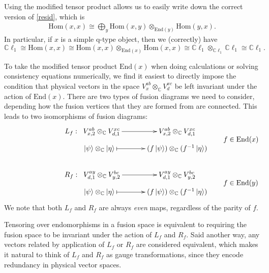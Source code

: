 \documentclass[12pt,a4paper]{article}
\newcommand{\tp}{\otimes}
\newcommand\be            {\begin{equation}}
\newcommand\ee            {\end{equation}}
\newcommand{\Hom}{\text{Hom}}
\newcommand{\End}{\text{End}}
\newcommand{\cl}{\mathbb{C}\ell}
\newcommand{\ket}[1]{\ensuremath{\left|#1\right\rangle}}
\begin{document}
Using the modified tensor product allows us to easily write down the correct version of \eqref{resid}, which is 
\begin{align}
\Hom(x,x) \cong \bigoplus_y \Hom(x,y) \tp_{\End(y)} \Hom(y,x).
\end{align}
In particular, if $x$ is a simple q-type object, then we (correctly) have \be
\cl_1 \cong \Hom(x,x) \cong \Hom(x,x)\tp_{\End(x)} \Hom(x,x) \cong \cl_1\tp_{\cl_1}\cl_1 \cong \cl_1.\ee  

To take the modified tensor product $\End(x)$ when doing calculations or solving consistency equations numerically, we find it easiest to directly impose the condition that physical vectors in the space $V^{ab}_x \tp_{\mathbb{C}} V^{xc}_d$ be left invariant under the action of $\text{End}(x)$. 
There are two types of fusion diagrams we need to consider, depending how the fusion vertices that they are formed from are connected. This leads to two isomorphisms of fusion diagrams:
\begin{align}
&\vcenter{\xymatrix @!0 @M=1mm @C=42mm{
 &L_f: \; \;V^{ab}_{x,2} \tp_{\mathbb{C}} V^{xc}_{d,1} \ar[r]            & V^{ab}_{x,2} \tp_{\mathbb{C}} V^{xc}_{d,1}  \\
		  &\;\;\;\;\;\;\; \ket{\psi}\tp_\mathbb{C} \ket{\eta}  \ar@{|->}[r] & (f\ket{\psi}) \tp_{\mathbb{C}} (f^{-1} \ket{\eta})  
		  }} \quad \quad f \in \text{End}(x)\\
		  \\		  
&		  \vcenter{\xymatrix @!0 @M=1mm @C=42mm{
		  &R_f: \; \;V^{ay}_{d,1} \tp_{\mathbb{C}} V^{bc}_{y,2} \ar[r]            & V^{ay}_{d,1} \tp_{\mathbb{C}} V^{bc}_{y,2} \\
		  &\;\;\;\;\;\;\; \ket{\psi}\tp_\mathbb{C} \ket{\eta}  \ar@{|->}[r] & (f\ket{\psi}) \tp_{\mathbb{C}} (f^{-1} \ket{\eta})
	}}	\quad \quad f \in \text{End}(y)
	\label{DotSlide}
	\end{align}
We note that both $L_f$ and $R_f$ are always {\it even} maps, regardless of the parity of $f$. 

Tensoring over endomorphisms in a fusion space is equivalent to requiring the fusion space to be invariant under the action of $L_f$ and $R_f$. 
Said another way, any vectors related by application of $L_f$ or $R_f$ are considered equivalent, which makes it natural to think of $L_f$ and $R_f$ as gauge transformations, since they encode redundancy in physical vector spaces.
\end{document}
